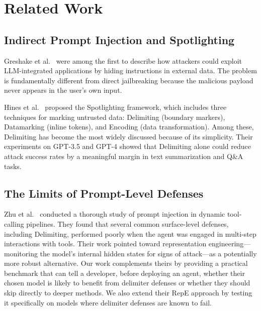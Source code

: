 \documentclass[journal]{IEEEtran}
\begin{document}
\section{Related Work}

\subsection{Indirect Prompt Injection and Spotlighting}
Greshake et al.~\cite{greshake2023indirect} were among the first to describe how attackers could exploit LLM-integrated applications by hiding instructions in external data. The problem is fundamentally different from direct jailbreaking because the malicious payload never appears in the user's own input.

Hines et al.~\cite{hines2024spotlighting} proposed the Spotlighting framework, which includes three techniques for marking untrusted data: Delimiting (boundary markers), Datamarking (inline tokens), and Encoding (data transformation). Among these, Delimiting has become the most widely discussed because of its simplicity. Their experiments on GPT-3.5 and GPT-4 showed that Delimiting alone could reduce attack success rates by a meaningful margin in text summarization and Q\&A tasks.

\subsection{The Limits of Prompt-Level Defenses}
Zhu et al.~\cite{zhu2026brittle} conducted a thorough study of prompt injection in dynamic tool-calling pipelines. They found that several common surface-level defenses, including Delimiting, performed poorly when the agent was engaged in multi-step interactions with tools. Their work pointed toward representation engineering---monitoring the model's internal hidden states for signs of attack---as a potentially more robust alternative. Our work complements theirs by providing a practical benchmark that can tell a developer, before deploying an agent, whether their chosen model is likely to benefit from delimiter defenses or whether they should skip directly to deeper methods. We also extend their RepE approach by testing it specifically on models where delimiter defenses are known to fail.
\end{document}
